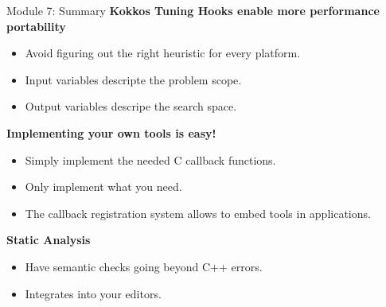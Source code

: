 \begin{frame}[fragile]{Module 7: Summary}
\textbf{Kokkos Tuning Hooks enable more performance portability}
\begin{itemize}
  \item Avoid figuring out the right heuristic for every platform.
  \item Input variables descripte the problem scope.
  \item Output variables descripe the search space.
\end{itemize}

\textbf{Implementing your own tools is easy!}
\begin{itemize}
  \item Simply implement the needed C callback functions.
  \item Only implement what you need.
  \item The callback registration system allows to embed tools in applications.
\end{itemize}

\textbf{Static Analysis}
\begin{itemize}
  \item Have semantic checks going beyond C++ errors.
  \item Integrates into your editors.
\end{itemize}
\end{frame}



